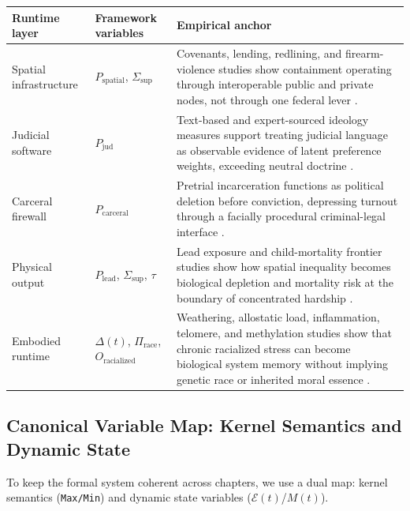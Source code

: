 \begin{center}
\renewcommand{\arraystretch}{1.25}
\begin{tabular}{>{\raggedright}p{3.0cm} >{\raggedright}p{3.2cm} >{\raggedright\arraybackslash}p{7.6cm}}
\toprule
\textbf{Runtime layer} & \textbf{Framework variables} & \textbf{Empirical anchor} \\
\midrule
Spatial infrastructure & $P_{\text{spatial}}$, $\Sigma_{\text{sup}}$ & Covenants, lending, redlining, and firearm-violence studies show containment operating through interoperable public and private nodes, not through one federal lever \cite{toney_housing_covenants_2026,barboza_salerno_redlining_firearm_2025}. \\
Judicial software & $P_{\text{jud}}$ & Text-based and expert-sourced ideology measures support treating judicial language as observable evidence of latent preference weights, exceeding neutral doctrine \cite{truscott_romano_judicial_text_2026,cope_judjis_2025}. \\
Carceral firewall & $P_{\text{carceral}}$ & Pretrial incarceration functions as political deletion before conviction, depressing turnout through a facially procedural criminal-legal interface \cite{enamorado_shadow_carceral_2024}. \\
Physical output & $P_{\text{lead}}$, $\Sigma_{\text{sup}}$, $\tau$ & Lead exposure and child-mortality frontier studies show how spatial inequality becomes biological depletion and mortality risk at the boundary of concentrated hardship \cite{berisha_lindstrom_kosovo_roma_2024,barboza_salerno_child_frontiers_2025}. \\
Embodied runtime & $\Delta(t)$, $\Pi_{\text{race}}$, $O_{\text{racialized}}$ & Weathering, allostatic load, inflammation, telomere, and methylation studies show that chronic racialized stress can become biological system memory without implying genetic race or inherited moral essence \cite{geronimus_weathering_2006,ruiz_narvaez_racism_methylation_2024,spears_lifespan_stress_inflammation_2026}. \\
\bottomrule
\end{tabular}
\end{center}

\subsection{Canonical Variable Map: Kernel Semantics and Dynamic State}

To keep the formal system coherent across chapters, we use a dual map: kernel semantics (\texttt{Max/Min}) and dynamic state variables ($\mathcal{E}(t)$/$M(t)$).

